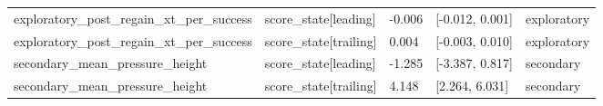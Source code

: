 \begin{table}[ht]
\begin{tabular}{lllll}
exploratory\_post\_regain\_xt\_per\_success & score\_state[leading] & -0.006 & [-0.012, 0.001] & exploratory \\
exploratory\_post\_regain\_xt\_per\_success & score\_state[trailing] & 0.004 & [-0.003, 0.010] & exploratory \\
secondary\_mean\_pressure\_height & score\_state[leading] & -1.285 & [-3.387, 0.817] & secondary \\
secondary\_mean\_pressure\_height & score\_state[trailing] & 4.148 & [2.264, 6.031] & secondary \\
\hline
\end{tabular}
\end{table}
